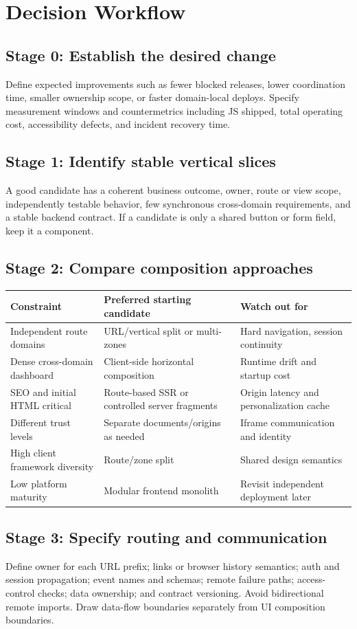 \documentclass[11pt,letterpaper,oneside]{report}
\begin{document}
\chapter{Decision Workflow}
\section{Stage 0: Establish the desired change}
Define expected improvements such as fewer blocked releases, lower coordination time, smaller ownership scope, or faster domain-local deploys. Specify measurement windows and countermetrics including JS shipped, total operating cost, accessibility defects, and incident recovery time.
\section{Stage 1: Identify stable vertical slices}
A good candidate has a coherent business outcome, owner, route or view scope, independently testable behavior, few synchronous cross-domain requirements, and a stable backend contract. If a candidate is only a shared button or form field, keep it a component.
\section{Stage 2: Compare composition approaches}
\begin{longtable}{>{\raggedright\arraybackslash}p{.27\linewidth}>{\raggedright\arraybackslash}p{.33\linewidth}>{\raggedright\arraybackslash}p{.31\linewidth}}\toprule Constraint & Preferred starting candidate & Watch out for \\\midrule
Independent route domains & URL/vertical split or multi-zones & Hard navigation, session continuity\\
Dense cross-domain dashboard & Client-side horizontal composition & Runtime drift and startup cost\\
SEO and initial HTML critical & Route-based SSR or controlled server fragments & Origin latency and personalization cache\\
Different trust levels & Separate documents/origins as needed & Iframe communication and identity\\
High client framework diversity & Route/zone split & Shared design semantics\\
Low platform maturity & Modular frontend monolith & Revisit independent deployment later\\\bottomrule\end{longtable}
\section{Stage 3: Specify routing and communication}
Define owner for each URL prefix; links or browser history semantics; auth and session propagation; event names and schemas; remote failure paths; access-control checks; data ownership; and contract versioning. Avoid bidirectional remote imports. Draw data-flow boundaries separately from UI composition boundaries.
\end{document}
